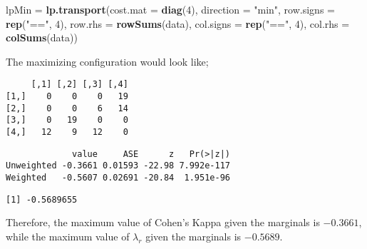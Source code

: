 \documentclass[]{article}
\newenvironment{Shaded}{\begin{snugshade}}{\end{snugshade}}
\newcommand{\KeywordTok}[1]{\textcolor[rgb]{0.13,0.29,0.53}{\textbf{#1}}}
\newcommand{\DataTypeTok}[1]{\textcolor[rgb]{0.13,0.29,0.53}{#1}}
\newcommand{\DecValTok}[1]{\textcolor[rgb]{0.00,0.00,0.81}{#1}}
\newcommand{\StringTok}[1]{\textcolor[rgb]{0.31,0.60,0.02}{#1}}
\newcommand{\OperatorTok}[1]{\textcolor[rgb]{0.81,0.36,0.00}{\textbf{#1}}}
\newcommand{\NormalTok}[1]{#1}
\begin{document}
\begin{Shaded}
\begin{Highlighting}[]
\NormalTok{lpMin =}\StringTok{ }\KeywordTok{lp.transport}\NormalTok{(}\DataTypeTok{cost.mat =} \KeywordTok{diag}\NormalTok{(}\DecValTok{4}\NormalTok{), }\DataTypeTok{direction =} \StringTok{"min"}\NormalTok{, }
             \DataTypeTok{row.signs =} \KeywordTok{rep}\NormalTok{(}\StringTok{"=="}\NormalTok{, }\DecValTok{4}\NormalTok{), }\DataTypeTok{row.rhs =} \KeywordTok{rowSums}\NormalTok{(data), }
             \DataTypeTok{col.signs =} \KeywordTok{rep}\NormalTok{(}\StringTok{"=="}\NormalTok{, }\DecValTok{4}\NormalTok{), }\DataTypeTok{col.rhs =} \KeywordTok{colSums}\NormalTok{(data))}
\end{Highlighting}
\end{Shaded}

The maximizing configuration would look like;

\begin{Shaded}
\end{Shaded}

\begin{verbatim}
     [,1] [,2] [,3] [,4]
[1,]    0    0    0   19
[2,]    0    0    6   14
[3,]    0   19    0    0
[4,]   12    9   12    0
\end{verbatim}

\begin{Shaded}
\end{Shaded}

\begin{verbatim}
             value     ASE      z   Pr(>|z|)
Unweighted -0.3661 0.01593 -22.98 7.992e-117
Weighted   -0.5607 0.02691 -20.84  1.951e-96
\end{verbatim}

\begin{Shaded}
\end{Shaded}

\begin{verbatim}
[1] -0.5689655
\end{verbatim}

Therefore, the maximum value of Cohen's Kappa given the marginals is
\(-0.3661\), while the maximum value of \(\lambda_r\) given the
marginals is \(-0.5689\).
\end{document}
